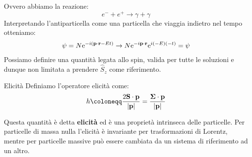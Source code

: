 Ovvero abbiamo la reazione:
\begin{equation}
    e^- + e^+ \rightarrow \gamma + \gamma
\end{equation}
Interpretando l'antiparticella come una particella che viaggia indietro nel tempo otteniamo:
\begin{equation}
  \psi = N \mathrm{e}^{-i\left(\vb{p}\cdot\vb{r} - Et\right)} \rightarrow N \mathrm{e}^{-i\vb{p}\cdot\vb{r}} \mathrm{e}^{i(-E)(-t)} = \psi
\end{equation}
Possiamo definire una quantità legata allo spin, valida per tutte le soluzioni e dunque non limitata a prendere $\hat{S}_z$ come riferimento.
\begin{definition}{Elicità}
    Definiamo l'operatore elicità come:
    \begin{equation}
        h \defineeq \dfrac{2\vec{S}\cdot\vec{p}}{\abs{\vec{p}}} = \dfrac{\boldsymbol{\Sigma}\cdot\vec{p}}{\abs{\vec{p}}}
    \end{equation}
\end{definition}
Questa quantità è detta \textbf{elicità} ed è una proprietà intrinseca delle particelle. Per particelle di massa nulla l'elicità è invariante per trasformazioni di Lorentz, mentre per particelle massive può essere cambiata da un sistema di riferimento ad un altro.\\
